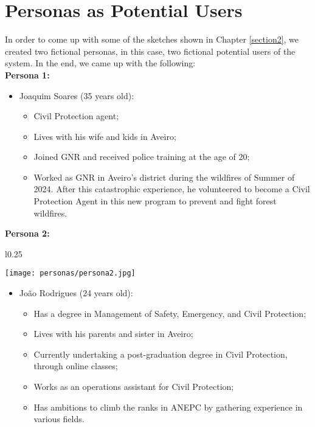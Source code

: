 \section{Personas as Potential Users}
In order to come up with some of the sketches shown in Chapter \ref{section2},
we created two fictional personas, in this case, two 
fictional potential users of the system. In the end, we came up 
with the following:
 \\

\textbf{Persona 1:}
\begin{itemize}
    \item Joaquim Soares (35 years old):
    \begin{itemize}
    \item Civil Protection agent;
    \item Lives with his wife and kids in Aveiro;
    \item Joined GNR and received police training at the age of 20;
    \item Worked as GNR in Aveiro's district during the wildfires of 
    Summer of 2024. 
    After this catastrophic experience, he volunteered to become a
    Civil Protection Agent in this new program to prevent and fight forest wildfires. \\
    \end{itemize}
\end{itemize} 

\textbf{Persona 2:} \\
\begin{wrapfigure}{l}{0.25\textwidth}
    \begin{center}
    \texttt{[image: personas/persona2.jpg]}
    \end{center}
\end{wrapfigure}
\begin{itemize}
    \item João Rodrigues (24 years old):
    \begin{itemize}
    \item Has a degree in Management of
    Safety, Emergency, and Civil Protection;
    \item Lives with his parents and sister in Aveiro;
    \item Currently undertaking a post-graduation degree in Civil Protection,
    through online classes;
    \item Works as an operations assistant for Civil Protection; 
    \item Has ambitions to
    climb the ranks in ANEPC by gathering experience in various fields.
    \end{itemize}
\end{itemize}
